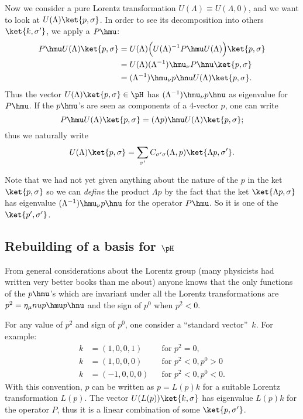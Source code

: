 Now we consider a pure Lorentz transformation $U(\Lambda)\equiv U(\Lambda,0)$, and we want to look at $U(\Lambda)\ket{p,\sigma}$. In order to see its decomposition into others $\ket{k,\sigma'}$, we apply a $P\hmu$:
\begin{equation}
	\begin{split}
		P\hmu U(\Lambda)\ket{p,\sigma}&=U(\Lambda)\Big( U(\Lambda)^{-1} P\hmu U(\Lambda)  \Big)\ket{p,\sigma}\\
		&=U(\Lambda) {(\Lambda^{-1})}\hmu_{\nu} P\hnu \ket{p,\sigma}\\
		&=(\Lambda^{-1})\hmu_{\nu} p\hnu U(\Lambda)\ket{p,\sigma}.
	\end{split}
\end{equation}
Thus the vector $U(\Lambda)\ket{p,\sigma}\in\pH$ has $(\Lambda^{-1})\hmu_{\nu} p\hnu$ as eigenvalue for $P\hmu$. If the $p\hmu$'s are seen as components of a $4$-vector $p$, one can write
\[
	P\hmu U(\Lambda)\ket{p,\sigma}=(\Lambda p)\hmu U(\Lambda)\ket{p,\sigma};
\]
thus we naturally write
\begin{equation}
	U(\Lambda)\ket{p,\sigma}=\sum_{\sigma'}C_{\sigma'\sigma}(\Lambda,p)\ket{\Lambda p,\sigma'}.
\end{equation}


Note that we had not yet given anything about the nature of the $p$ in the ket $\ket{p,\sigma}$ so we can \emph{define} the product $\Lambda p$ by the fact that the ket $\ket{\Lambda p,\sigma}$ has eigenvalue $(\Lambda^{-1})\hmu_{\nu} p\hnu$ for the operator $P\hmu$. So it is one of the $\ket{p',\sigma'}$.

\subsection{Rebuilding of a basis for \texorpdfstring{$\pH$}{H}}

From general considerations about the Lorentz group (many physicists had written very better books than me about) anyone knows that the only functions of the $p\hmu$'s  which are invariant under all the Lorentz transformations are $p^2=\eta_{\mu}nu p\hmu p\hnu$ and the sign of $p^0$ when $p^2< 0$.

For any value of $p^2$ and sign of $p^0$, one consider a ``standard vector''\ $k$. For example:
\begin{subequations}
	\begin{align}
		k & =(1,0,0,1)  &  & \text{for }p^2=0,       \\
		k & =(1,0,0,0)  &  & \text{for }p^2<0,p^0>0  \\
		k & =(-1,0,0,0) &  & \text{for }p^2<0,p^0<0.
	\end{align}
\end{subequations}
With this convention, $p$ can be written as $p=L(p)k$ for a suitable Lorentz transformation $L(p)$. The vector $U(L(p))\ket{k,\sigma}$ has eigenvalue $L(p)k$ for the operator $P$, thus it is a linear combination of some $\ket{p,\sigma'}$.

